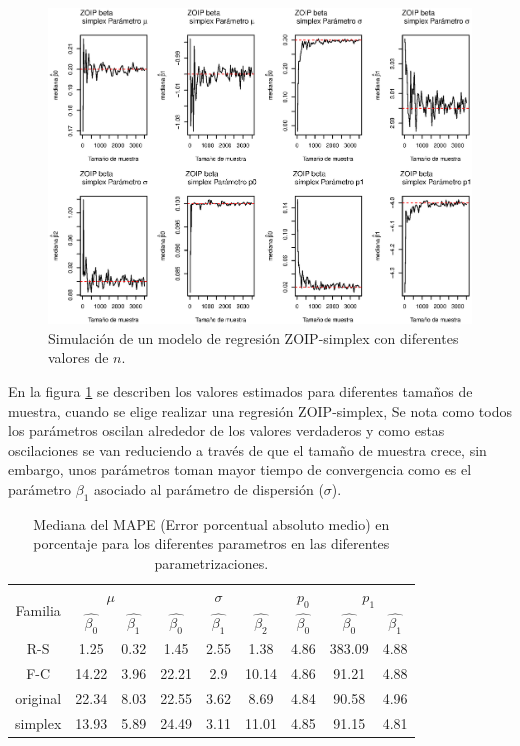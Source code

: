 \begin{figure}
	\begin{center}
		\includegraphics[scale=0.5]{Converg_Simplex.eps}	
		\caption{Simulaci\'{o}n de un modelo de regresi\'{o}n ZOIP-simplex con diferentes valores de $n$.}
		\label{Simu_simplex}
	\end{center}
\end{figure}

En la figura \ref{Simu_simplex} se describen los valores estimados para diferentes tama\~{n}os de muestra, cuando se elige realizar una regresi\'{o}n ZOIP-simplex, Se nota como todos los par\'{a}metros oscilan alrededor de los valores verdaderos y como estas oscilaciones se van reduciendo a trav\'{e}s de que el tama\~{n}o de muestra crece, sin embargo, unos par\'{a}metros toman mayor tiempo de convergencia como es el par\'{a}metro $\beta_1$ asociado al par\'{a}metro de dispersi\'{o}n ($\sigma$).\\



\begin{table}[!hbt]
{\scriptsize
\begin{center}
\begin{tabular}{|c|cc|ccc|c|cc|}\hline
\multirow{2}{*}{Familia} & \multicolumn{2}{|c|}{$\mu$} & \multicolumn{3}{|c|}{$\sigma$} & $p_0$ & \multicolumn{2}{|c|}{$p_1$} \\ \cline{2-9}
& $\hat{\beta_0}$& $\hat{\beta_1}$& $\hat{\beta_0}$& $\hat{\beta_1}$& $\hat{\beta_2}$& $\hat{\beta_0}$ & $\hat{\beta_0}$ & $\hat{\beta_1}$ \\ \hline \hline
R-S & 1.25 & 0.32 & 1.45 & 2.55 & 1.38 & 4.86 & 383.09 & 4.88 \\ 
F-C & 14.22 & 3.96 & 22.21 & 2.9 & 10.14 & 4.86 & 91.21 & 4.88 \\
original & 22.34 & 8.03 & 22.55 & 3.62 & 8.69 & 4.84 & 90.58 & 4.96 \\
simplex & 13.93 & 5.89 & 24.49 & 3.11 & 11.01 & 4.85 & 91.15 & 4.81 \\ \hline
\end{tabular}
\caption{Mediana del MAPE (Error porcentual absoluto medio) en porcentaje para los diferentes parametros en las diferentes parametrizaciones.}
\label{MAPE}
\end{center}
}
\end{table}

